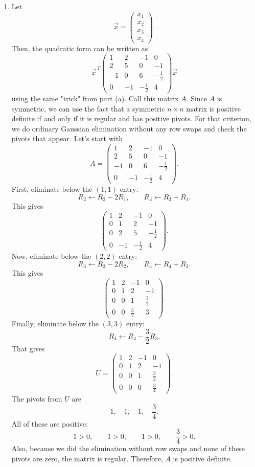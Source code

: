 \documentclass[10pt]{extarticle}
\begin{document}
\begin{enumerate}[label=(\alph*)]
\item Let
\[
\vec{x}=
\begin{pmatrix}
x_1\\
x_2\\
x_3\\
x_4
\end{pmatrix}.
\]
Then, the quadratic form can be written as
\[
\vec{x}^{\,T}
\begin{pmatrix}
1 & 2 & -1 & 0\\
2 & 5 & 0 & -1\\
-1 & 0 & 6 & -\frac{1}{2}\\[0.3em]
0 & -1 & -\frac{1}{2} & 4
\end{pmatrix}
\vec{x}
\]
using the same "trick" from part (a). Call this matrix $A$. Since $A$ is symmetric, we can use the fact that a symmetric $n\times n$ matrix is positive definite if and only if it is regular and has positive pivots. For that criterion, we do ordinary Gaussian elimination without any row swaps and check the pivots that appear. Let's start with
\[
A=
\begin{pmatrix}
1 & 2 & -1 & 0\\
2 & 5 & 0 & -1\\
-1 & 0 & 6 & -\frac{1}{2}\\[0.3em]
0 & -1 & -\frac{1}{2} & 4
\end{pmatrix}.
\]
First, eliminate below the $(1,1)$ entry:
\[
R_2\leftarrow R_2-2R_1,
\qquad
R_3\leftarrow R_3+R_1.
\]
This gives
\[
\begin{pmatrix}
1 & 2 & -1 & 0\\
0 & 1 & 2 & -1\\
0 & 2 & 5 & -\frac{1}{2}\\[0.3em]
0 & -1 & -\frac{1}{2} & 4
\end{pmatrix}.
\]
Now, eliminate below the $(2,2)$ entry:
\[
R_3\leftarrow R_3-2R_2,
\qquad
R_4\leftarrow R_4+R_2.
\]
This gives
\[
\begin{pmatrix}
1 & 2 & -1 & 0\\
0 & 1 & 2 & -1\\
0 & 0 & 1 & \frac{3}{2}\\[0.3em]
0 & 0 & \frac{3}{2} & 3
\end{pmatrix}.
\]
Finally, eliminate below the $(3,3)$ entry:
\[
R_4\leftarrow R_4-\frac{3}{2}R_3.
\]
That gives
\[
U=
\begin{pmatrix}
1 & 2 & -1 & 0\\
0 & 1 & 2 & -1\\
0 & 0 & 1 & \frac{3}{2}\\[0.3em]
0 & 0 & 0 & \frac{3}{4}
\end{pmatrix}.
\]
The pivots from $U$ are
\[
1,\quad 1,\quad 1,\quad \frac{3}{4}.
\]
All of these are positive:
\[
1>0,\qquad 1>0,\qquad 1>0,\qquad \frac{3}{4}>0.
\]
Also, because we did the elimination without row swaps and none of these pivots are zero, the matrix is regular. Therefore, $A$ is positive definite.
\end{enumerate}
\end{document}
